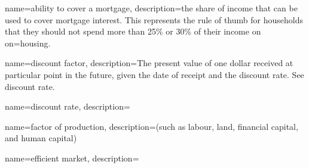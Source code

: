 

{
name=ability to cover a mortgage,
description={the share of income that can be used to cover mortgage interest. This represents the rule of thumb for households that they should not  spend more than 25\% or 30\% of their income on on=housing.}
}


{
name=discount factor,
description={The present value of one dollar received at particular point in the future, given the date of receipt and the \gls{discount rate}. See \gls{discount rate}. %
} %
}


{
name=discount rate,
description={} 
}



{
name=factor of production,
description={(such as labour, land, financial capital,  and human capital)}
}


{
name=efficient market,
description={} %
}



